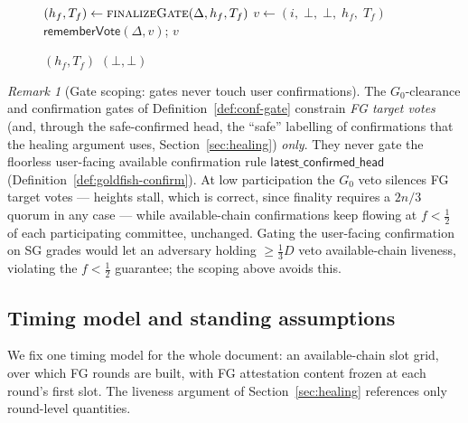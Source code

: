 \ifx\litemode\undefined\documentclass{article}\fi
\newcommand{\getFinalVote}{\textsf{getFinalVote}\xspace}
\newcommand{\rememberVote}{\textsf{rememberVote}\xspace}
\newcommand{\Dvote}{\ensuremath{D}}         %
\newcommand{\Gzero}{\ensuremath{G_{0}}}
\newcommand{\latestConfirmed}{\textsf{latest\_confirmed\_head}\xspace}
\theoremstyle{plain}
\theoremstyle{definition}
\theoremstyle{remark}
\newtheorem{remark}[theorem]{Remark}
\begin{document}
\begin{figure}[H]
\begin{center}
\begin{boxedminipage}{\textwidth}
\begin{algorithmic}[1]
 
  \State $(h_f, T_f) \gets \textsc{finalizeGate}(\Delta, h_f, T_f)$
  \State $v \gets (i,\; \bot,\; \bot,\; h_f,\; T_f)$ 
  \State $\rememberVote(\Delta, v)$; \quad \Return $v$
\EndFunction
\vspace{3pt}

 \Comment{same finalize gate as \getFinalVote}
    \State \Return $(h_f, T_f)$
  \Else
    \State \Return $(\bot, \bot)$
  \EndIf
\EndFunction

\end{algorithmic}
\end{boxedminipage}
\end{center}
\end{figure}

\begin{remark}[Gate scoping: gates never touch user confirmations]\label{rem:gate-scoping}
The $\Gzero$-clearance and confirmation gates of
Definition~\ref{def:conf-gate} constrain \emph{FG target votes} (and, through
the safe-confirmed head, the ``safe'' labelling of confirmations that the
healing argument uses, Section~\ref{sec:healing}) \emph{only}.  They never gate
the floorless user-facing available confirmation rule $\latestConfirmed$
(Definition~\ref{def:goldfish-confirm}).  At low participation the $\Gzero$ veto
silences FG target votes --- heights stall, which is correct, since finality
requires a $2n/3$ quorum in any case --- while available-chain confirmations
keep flowing at $f < \tfrac12$ of each participating committee, unchanged.
Gating the user-facing confirmation on SG grades would let an adversary holding
$\geq\tfrac13\Dvote$ veto available-chain liveness, violating the
$f<\tfrac12$ guarantee; the scoping above avoids this.
\end{remark}

\subsection{Timing model and standing assumptions}\label{sec:timing}

We fix one timing model for the whole document: an available-chain slot
grid, over which FG rounds are built, with FG attestation content frozen at
each round's first slot.  The liveness argument of
Section~\ref{sec:healing} references only round-level quantities.
\end{document}
